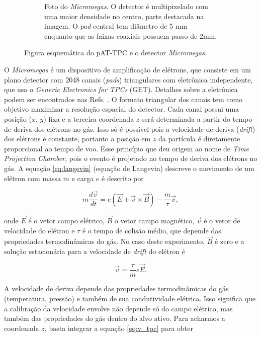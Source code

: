 \documentclass[a4paper,12pt,oneside]{book}
\begin{document}
\begin{figure}[H]
\begin{subfigure}[t]{0.49\textwidth}
        \caption{Foto do \textit{Micromegas}. O detector é multipixelado com uma maior densidade no centro, parte destacada na imagem. O \textit{pad} central tem diâmetro de 5 mm enquanto que as faixas coaxiais possuem passo de 2mm\cite{attpc, josh_bradt}.}
        \label{subfig:micromegas} 
    \end{subfigure}
\caption{Figura esquemática do pAT-TPC e o detector \textit{Micromegas}\cite{pattpc}.}
\label{fig:pattpc_e_micromegas}
\end{figure}

\par O \textit{Micromegas} é um dispositivo de amplificação de elétrons, que consiste em um plano detector com 2048 canais (\textit{pads}) triangulares com eletrônica independente, que usa o \textit{Generic Electronics for TPCs} (GET)\cite{GET}. Detalhes sobre a eletrônica podem ser encontrados nas Refs. \cite{GET, josh_bradt}. O formato triangular dos canais tem como objetivo maximizar a resolução espacial do detector. Cada canal possui uma posição ($x$, $y$) fixa e a terceira coordenada $z$ será determinada a partir do tempo de deriva dos elétrons no gás\cite{pattpc, pattpc2, attpc, josh_bradt}. Isso só é possível pois a velocidade de deriva (\textit{drift}) dos elétrons é constante\cite{drift_constant}, portanto a posição em $z$ da partícula é diretamente proporcional ao tempo de voo. Esse princípio que deu origem ao nome de \textit{Time Projection Chamber}, pois o evento é projetado no tempo de deriva dos elétrons no gás. A equação  \ref{eq:langevin} (equação de Langevin) descreve o movimento de um elétron com massa $m$ e carga $e$ é descrito por\cite{drift_constant}

\begin{equation}\label{eq:langevin}
    m\frac{d\vec{v}}{dt} = e\left(\vec{E} +\vec{v}\times \vec{B}\right) - \frac{m}{\tau}\vec{v},
\end{equation}

onde $\vec{E}$ é o vetor campo elétrico, $\vec{B}$ o vetor campo magnético, $\vec{v}$ é o vetor de velocidade do elétron e $\tau$ é o tempo de colisão médio, que depende das propriedades termodinâmicas do gás. No caso deste experimento, $\vec{B}$ é zero e a solução estacionária para a velocidade de \textit{drift} do elétron é

\begin{equation}\label{eq:v_tpc}
    \vec{v} = \frac{\tau}{m}e\vec{E}.
\end{equation}

\par A velocidade de deriva depende das propriedades termodinâmicas do gás (temperatura, pressão) e também de sua condutividade elétrica\cite{drift_constant}. Isso significa que a calibração da velocidade envolve não depende só do campo elétrico, mas também das propriedades do gás dentro do alvo ativo\cite{pattpc, drift_constant}. Para acharmos a coordenada $z$, basta integrar a equação \ref{eq:v_tpc} para obter
\end{document}
